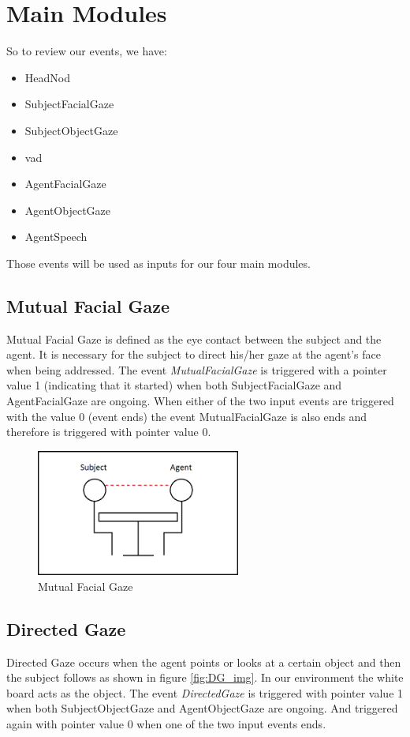 \documentclass[12pt, a4paper, fleqn]{memoir}%
\begin{document}
\chapter{Main Modules}
\label{chap:MainModules}
So to review our events, we have:

\begin{itemize}
  \item HeadNod
  \item SubjectFacialGaze
  \item SubjectObjectGaze
  \item vad
  \item AgentFacialGaze
  \item AgentObjectGaze
  \item AgentSpeech
\end{itemize}

Those events will be used as inputs for our four main modules.

\section{Mutual Facial Gaze}
\label{sec:MutualFacialGaze}
Mutual Facial Gaze is defined as the eye contact between the subject and the agent. It is necessary for the subject to direct his/her gaze at the agent's face when being addressed. The event \textit{MutualFacialGaze} is triggered with a pointer value 1 (indicating that it started) when both SubjectFacialGaze and AgentFacialGaze are ongoing. When either of the two input events are triggered with the value 0 (event ends) the event MutualFacialGaze is also ends and therefore is triggered with pointer value 0.

\begin{figure}[h!]
    \centering
    \includegraphics[width=0.6\textwidth]{MFG}
    \caption{Mutual Facial Gaze}
    \label{fig:MFG_img}
\end{figure}

\section{Directed Gaze}
\label{sec:DirectedGaze}
Directed Gaze occurs when the agent points or looks at a certain object and then the subject follows as shown in figure \ref{fig:DG_img}. In our environment the white board acts as the object. The event \textit{DirectedGaze} is triggered with pointer value 1 when both SubjectObjectGaze and AgentObjectGaze are ongoing. And triggered again with pointer value 0 when one of the two input events ends.
\end{document}
